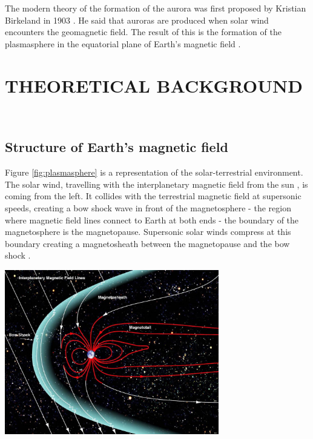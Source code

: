 \documentclass[12pt]{article}
\newenvironment{Figure}
  {\par\medskip\noindent\minipage{\linewidth}}
  {\endminipage\par\medskip}
\begin{document}
The modern theory of the formation of the aurora was first proposed by Kristian Birkeland in 1903 \cite{birkeland2018norwegian}. He said that auroras are produced when solar wind encounters the geomagnetic field. The result of this is the formation of the plasmasphere in the equatorial plane of Earth's magnetic field \cite{cosmicelectrodyn}.

\section{THEORETICAL BACKGROUND}
\hfill \\
\hfill

\subsection{Structure of Earth's magnetic field}
Figure \ref{fig:plasmasphere} is a representation of the solar-terrestrial environment. The solar wind, travelling with the interplanetary magnetic field from the sun \cite{Svalgaard_2010}, is coming from the left. It collides with the terrestrial magnetic field at supersonic speeds, creating a bow shock wave in front of the magnetosphere - the region where magnetic field lines connect to Earth at both ends - the boundary of the magnetosphere is the magnetopause. Supersonic solar winds compress at this boundary creating a magnetosheath between the magnetopause and the bow shock \cite{BSPP}.

\begin{Figure}
    \begin{minipage}[c]{0.57\textwidth}
        \centering
        \includegraphics[width=0.7\textwidth]{NASA-Magnetosphere.jpeg}
    \end{minipage}\hfill
    \begin{minipage}[c]{0.4\textwidth}
        \label{fig:plasmasphere}
    \end{minipage}
\end{Figure}
\end{document}
